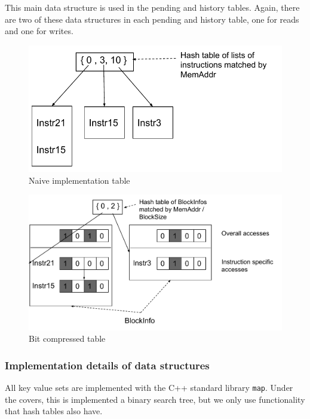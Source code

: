\documentclass[12pt,twoside]{reedthesis}
\begin{document}
			This main data structure is used in the pending and history tables. Again, there are two of these data structures in each pending and history table, one for reads and one for writes. 
			
			\begin{figure}[h]
				\caption{Naive implementation table}
				\label{fig:naive-table}
				\includegraphics[scale=0.85]{BlockSetnaive_structure.pdf}
			\end{figure}
		
			\begin{figure}[h]
				\caption{Bit compressed table}
				\label{fig:bit-comp-idea}
				\includegraphics[scale=0.85]{BlockSet_accesses.pdf}
			\end{figure}
		
			\subsubsection{Implementation details of data structures}
			
			All key value sets are implemented with the C++ standard library \texttt{map}. Under the covers, this is implemented a binary search tree, but we only use functionality that hash tables also have. 
			
\end{document}
